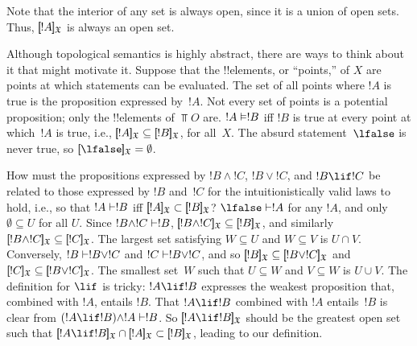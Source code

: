 \documentclass[../../../include/open-logic-section]{subfiles}
\begin{document}
Note that the interior of any set is always open, since it is a union
of open sets. Thus, $\Prop{X}{!A}$ is always an open set.

Although topological semantics is highly abstract, there are ways to
think about it that might motivate it. Suppose that the !!{element}s,
or ``points,'' of $X$ are points at which statements can be
evaluated. The set of all points where $!A$ is true is the proposition
expressed by~$!A$. Not every set of points is a potential proposition;
only the !!{element}s of $\Top{O}$ are.  $!A \Entails !B$ iff $!B$ is
true at every point at which~$!A$ is true, i.e., $\Prop{X}{!A}
\subseteq \Prop{X}{!B}$, for all~$X$. The absurd statement~$\lfalse$
is never true, so $\Prop{X}{\lfalse} = \emptyset$.

How must the propositions expressed by $!B \land !C$, $!B \lor !C$,
and $!B \lif !C$ be related to those expressed by $!B$ and~$!C$ for
the intuitionistically valid laws to hold, i.e., so that $!A \Proves
!B$ iff $\Prop{X}{!A} \subset \Prop{X}{!B}$? $\lfalse \Proves !A$ for
any $!A$, and only $\emptyset \subseteq U$ for all $U$.  Since $!B
\land !C \Proves !B$, $\Prop{X}{!B \land !C} \subseteq \Prop{X}{!B}$,
and similarly $\Prop{X}{!B \land !C} \subseteq \Prop{X}{!C}$. The
largest set satisfying $W \subseteq U$ and $W \subseteq V$ is $U \cap
V$. Conversely, $!B \Proves !B \lor !C$ and $!C \Proves !B \lor !C$,
and so $\Prop{X}{!B} \subseteq \Prop{X}{!B \lor !C}$ and $\Prop{X}{!C}
\subseteq \Prop{X}{!B \lor !C}$. The smallest set~$W$ such that $U
\subseteq W$ and $V \subseteq W$ is $U \cup V$.  The definition for
$\lif$ is tricky: $!A \lif !B$ expresses the weakest proposition that,
combined with $!A$, entails $!B$. That $!A \lif !B$ combined with $!A$
entails~$!B$ is clear from $(!A \lif !B) \land !A \Proves !B $. So
$\Prop{X}{!A \lif !B}$ should be the greatest open set such that
$\Prop{X}{!A \lif !B} \cap \Prop{X}{!A} \subset \Prop{X}{!B}$, leading
to our definition.
\end{document}

